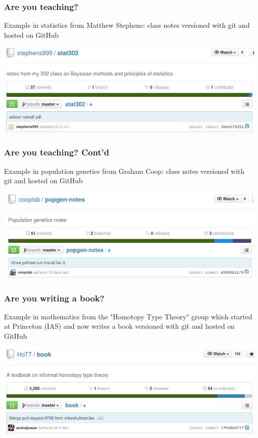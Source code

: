 \documentclass[c]{beamer} %
\begin{document}
\begin{frame}
  \frametitle{Are you teaching?}
  Example in \alert{statistics} from Matthew Stephens: class notes versioned with git and hosted on GitHub
  
  \bigskip
  
  \begin{center}
    \includegraphics[width=\textwidth,height=\textheight,keepaspectratio=true]{mstephens_stat302}%
  \end{center}
\end{frame}  

\begin{frame}
  \frametitle{Are you teaching? Cont'd}
  Example in \alert{population genetics} from Graham Coop: class notes versioned with git and hosted on GitHub
  
  \bigskip
  
  \begin{center}
    \includegraphics[width=\textwidth,height=\textheight,keepaspectratio=true]{cooplab_popgen}%
  \end{center}
\end{frame}  

\begin{frame}
  \frametitle{Are you writing a book?}
  Example in \alert{mathematics} from the "Homotopy Type Theory" group which started at Princeton (IAS) and now writes a book versioned with git and hosted on GitHub
  
  \bigskip
  
  \begin{center}
    \includegraphics[width=\textwidth,height=\textheight,keepaspectratio=true]{HoTT_book}%
  \end{center}
\end{frame}
\end{document}
